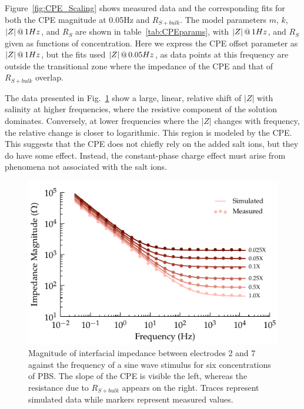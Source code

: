 \documentclass[journal, a4paper]{IEEEtran}
\begin{document}
Figure~\ref{fig:CPE_Scaling} shows measured data and the corresponding fits for both the CPE magnitude at 0.05\thinspace Hz and $R_{S+bulk}$. The model parameters $m$, $k$, $|Z|\thinspace @\thinspace 1Hz$, and $R_S$ are shown in table~\ref{tab:CPEparams}, with $|Z|\thinspace @\thinspace 1Hz$, and $R_S$ given as functions of concentration.
Here we express the CPE offset parameter as $|Z|\thinspace @ \thinspace 1Hz$, but the fits used $|Z|\thinspace @ \thinspace 0.05Hz$, as data points at this frequency are outside the transitional zone where the impedance of the CPE and that of $R_{S+bulk}$ overlap.

The data presented in Fig.~\ref{fig:CPE_Magnitude} show a large, linear, relative shift of $|Z|$ with salinity at higher frequencies, where the resistive component of the solution dominates.
Conversely, at lower frequencies where the $|Z|$ changes with frequency, the relative change is closer to logarithmic. This region is modeled by the CPE.
This suggests that the CPE does not chiefly rely on the added salt ions, but they do have some effect.
Instead, the constant-phase charge effect must arise from phenomena not associated with the salt ions.


\begin{figure}
    \begin{center}
        \includegraphics{graphics/displacement_impedanceVsFrequency_magnitude}
    \end{center}
    \caption{Magnitude of interfacial impedance between electrodes 2 and 7 against the frequency of a sine wave stimulus for six concentrations of PBS. The slope of the CPE is visible the left, whereas the resistance due to $R_{S+bulk}$ appears on the right. Traces represent simulated data while markers represent measured values.}
    \label{fig:CPE_Magnitude}
\end{figure}
\end{document}
